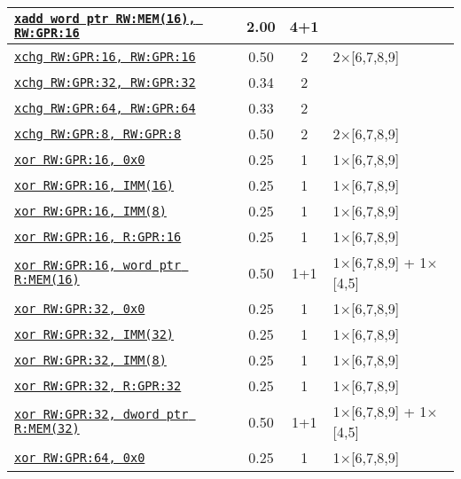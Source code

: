 \documentclass[a4paper,english,fontsize=9]{scrartcl}
\begin{document}
\begin{longtable}{p{}ccL{.25\textwidth}}
  \midrule
  \texttt{\href{https://felixcloutier.com/x86/XADD.html}{xadd word ptr RW:MEM(16), RW:GPR:16}} & 2.00 & 4+1 &  \\
  \midrule
  \texttt{\href{https://felixcloutier.com/x86/XCHG.html}{xchg RW:GPR:16, RW:GPR:16}} & 0.50 & 2 & 2\(\times\)[6,7,8,9] \\
  \midrule
  \texttt{\href{https://felixcloutier.com/x86/XCHG.html}{xchg RW:GPR:32, RW:GPR:32}} & 0.34 & 2 &  \\
  \midrule
  \texttt{\href{https://felixcloutier.com/x86/XCHG.html}{xchg RW:GPR:64, RW:GPR:64}} & 0.33 & 2 &  \\
  \midrule
  \texttt{\href{https://felixcloutier.com/x86/XCHG.html}{xchg RW:GPR:8, RW:GPR:8}} & 0.50 & 2 & 2\(\times\)[6,7,8,9] \\
  \midrule
  \texttt{\href{https://felixcloutier.com/x86/XOR.html}{xor RW:GPR:16, 0x0}} & 0.25 & 1 & 1\(\times\)[6,7,8,9] \\
  \midrule
  \texttt{\href{https://felixcloutier.com/x86/XOR.html}{xor RW:GPR:16, IMM(16)}} & 0.25 & 1 & 1\(\times\)[6,7,8,9] \\
  \midrule
  \texttt{\href{https://felixcloutier.com/x86/XOR.html}{xor RW:GPR:16, IMM(8)}} & 0.25 & 1 & 1\(\times\)[6,7,8,9] \\
  \midrule
  \texttt{\href{https://felixcloutier.com/x86/XOR.html}{xor RW:GPR:16, R:GPR:16}} & 0.25 & 1 & 1\(\times\)[6,7,8,9] \\
  \midrule
  \texttt{\href{https://felixcloutier.com/x86/XOR.html}{xor RW:GPR:16, word ptr R:MEM(16)}} & 0.50 & 1+1 & 1\(\times\)[6,7,8,9] + 1\(\times\)[4,5] \\
  \midrule
  \texttt{\href{https://felixcloutier.com/x86/XOR.html}{xor RW:GPR:32, 0x0}} & 0.25 & 1 & 1\(\times\)[6,7,8,9] \\
  \midrule
  \texttt{\href{https://felixcloutier.com/x86/XOR.html}{xor RW:GPR:32, IMM(32)}} & 0.25 & 1 & 1\(\times\)[6,7,8,9] \\
  \midrule
  \texttt{\href{https://felixcloutier.com/x86/XOR.html}{xor RW:GPR:32, IMM(8)}} & 0.25 & 1 & 1\(\times\)[6,7,8,9] \\
  \midrule
  \texttt{\href{https://felixcloutier.com/x86/XOR.html}{xor RW:GPR:32, R:GPR:32}} & 0.25 & 1 & 1\(\times\)[6,7,8,9] \\
  \midrule
  \texttt{\href{https://felixcloutier.com/x86/XOR.html}{xor RW:GPR:32, dword ptr R:MEM(32)}} & 0.50 & 1+1 & 1\(\times\)[6,7,8,9] + 1\(\times\)[4,5] \\
  \midrule
  \texttt{\href{https://felixcloutier.com/x86/XOR.html}{xor RW:GPR:64, 0x0}} & 0.25 & 1 & 1\(\times\)[6,7,8,9] \\

\end{longtable}
\end{document}
